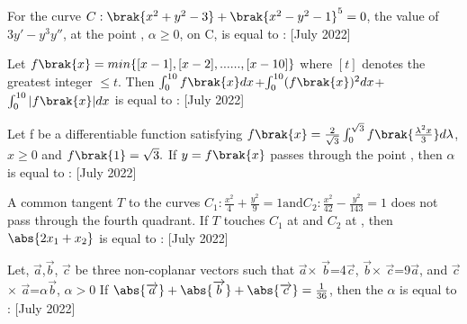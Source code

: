     \item For the curve $C: \brak{x^2+y^2-3}+\brak{x^2-y^2-1}^5=0$, the value of $3y'-y^3y''$, at the point \brak{\alpha,\alpha
    }, $\alpha \geq 0$, on C, is equal to  :
 \hfill{[July 2022]}
    \item Let $f\brak{x}=min\{[x-1],[x-2],......,[x-10]\}$ where $[t]$ denotes the greatest integer $\leq t$. Then $\int_{0}^{10}f\brak{x}dx$+$\int_{0}^{10}(f\brak{x})^2dx$+$\int_{0}^{10}|f\brak{x}|dx$ is equal to :
\hfill{[July 2022]}
    \item Let f be a differentiable function satisfying $f\brak{x}=\frac{2}{\sqrt{3}}\int_{0}^{\sqrt{3}}  f\brak{\frac{\lambda^2x}{3}}d\lambda$, $x\geq0$ and $f\brak{1}=\sqrt{3}.$ If $y=f\brak{x}$ passes through the point , then $\alpha$ is equal to :
  \hfill{[July 2022]}
    \item A common tangent $T$ to the curves $C_1 : \frac{x^2}{4}+\frac{y^2}{9}=1 \text{and} C_2:\frac{x^2}{42}-\frac{y^2}{143}=1 $ does not pass through the fourth quadrant. If $T$ touches $C_1$ at  and $C_2$ at , then $\abs{2x_1+x_2}$ is equal to :
\hfill{[July 2022]}
    \item Let, $\overrightarrow{a}$,$\overrightarrow{b}$, $\overrightarrow{c}$ be three non-coplanar vectors such that  $\overrightarrow{a}$$\times$ $\overrightarrow{b}$=4$\overrightarrow{c}$,  $\overrightarrow{b}$$\times$ $\overrightarrow{c}$=9$\overrightarrow{a}$, and  $\overrightarrow{c}$$\times$ $\overrightarrow{a}$=$\alpha$$\overrightarrow{b}$, $\alpha >0$
If $\abs{\overrightarrow{a}}+\abs{\overrightarrow{b}}+\abs{\overrightarrow{c}}=\frac{1}{36}$, then the $\alpha$ is equal to :
\hfill{[July 2022]}
